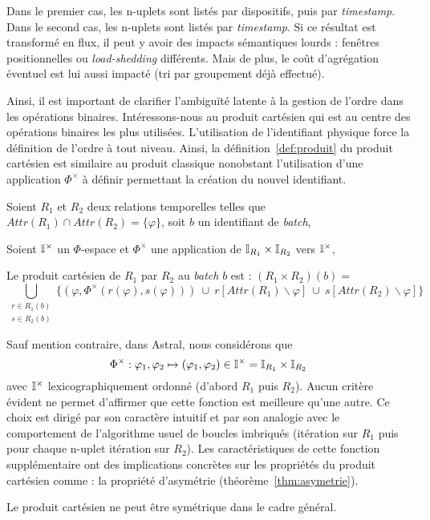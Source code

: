 \begin{example}
Dans le premier cas, les n-uplets sont listés par dispositifs, puis par \textit{timestamp}. Dans le second cas, les n-uplets sont listés par \textit{timestamp}. Si ce résultat est transformé en flux, il peut y avoir des impacts sémantiques lourds : fenêtres positionnelles ou \textit{load-shedding} différents. Mais de plus, le coût d'agrégation éventuel est lui aussi impacté (tri par groupement déjà effectué).
\end{example}

Ainsi, il est important de clarifier l'ambiguïté latente à la gestion de l'ordre dans les opérations binaires. Intéressons-nous au produit cartésien qui est au centre des opérations binaires les plus utilisées. L'utilisation de l'identifiant physique force la définition de l'ordre à tout niveau. Ainsi, la définition~\ref{def:produit} du produit cartésien est similaire au produit classique nonobstant l'utilisation d'une application $\Phi^\times$ à définir permettant la création du nouvel identifiant.
\begin{defi}\label{def:produit}
Soient $R_1$ et $R_2$ deux relations temporelles telles que $Attr(R_1) \cap Attr(R_2) = \{\varphi\}$, soit $b$ un identifiant de \textit{batch},

Soient $\mathbb{I}^{\times}$ un $\Phi$-espace et $\Phi^\times$ une application de $\mathbb{I}_{R_1}\times\mathbb{I}_{R_2}$ vers $\mathbb{I}^\times$,

Le produit cartésien de $R_1$ par $R_2$ au \textit{batch} $b$ est : $(R_1\times R_2)(b)=$
$$\bigcup_{\begin{array}{c}  r \in R_1(b)\\ s \in R_2(b)\end{array}} \{(\varphi, \Phi^\times(r(\varphi), s(\varphi))) \ \cup \ r[Attr(R_1)\backslash \varphi]\ \cup\ s[Attr(R_2)\backslash \varphi]\}$$
\end{defi}

Sauf mention contraire, dans Astral, nous considérons que $$\Phi^\times : \varphi_1, \varphi_2 \mapsto (\varphi_1,\varphi_2)\in \mathbb{I}^\times=\mathbb{I}_{R_1}\times \mathbb{I}_{R_2}$$ avec $\mathbb{I}^\times$ lexicographiquement ordonné (d'abord $R_1$ puis $R_2$). Aucun critère évident ne permet d'affirmer que cette fonction est meilleure qu'une autre. Ce choix est dirigé par son caractère intuitif et par son analogie avec le comportement de l'algorithme usuel de boucles imbriqués (itération sur $R_1$ puis pour chaque n-uplet itération sur $R_2$). Les caractéristiques de cette fonction supplémentaire ont des implications concrètes sur les propriétés du produit cartésien comme : la propriété d'asymétrie (théorème~\ref{thm:asymetrie}). 
\begin{thm}\label{thm:asymetrie}
    Le produit cartésien ne peut être symétrique dans le cadre général.
\end{thm}

